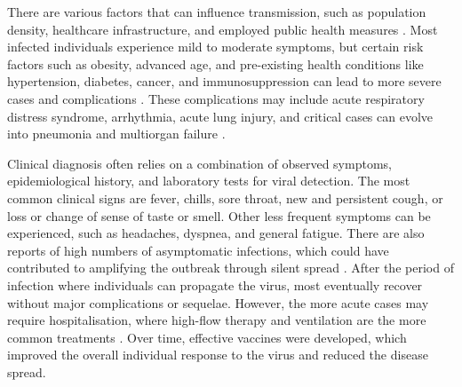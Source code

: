 There are various factors that can influence \covid transmission, such as population density, healthcare infrastructure, and employed public health measures \citep{halaji2021EpidemiologyCOVID19}.
Most infected individuals experience mild to moderate symptoms, but certain risk factors such as obesity, advanced age, and pre-existing health conditions like hypertension, diabetes, cancer, and immunosuppression can lead to more severe cases and complications \citep{meyerowitz2024ClinicalCourse}.
These complications may include acute respiratory distress syndrome, arrhythmia, acute lung injury, and critical cases can evolve into pneumonia and multiorgan failure \citep{wang2020ClinicalCharacteristics, lamers2022SARSCoV2Pathogenesis}.


Clinical diagnosis often relies on a combination of observed symptoms, epidemiological history, and laboratory tests for viral detection.
The most common clinical signs are fever, chills, sore throat, new and persistent cough, or loss or change of sense of taste or smell.
Other less frequent symptoms can be experienced, such as headaches, dyspnea, and general fatigue.
There are also reports of high numbers of asymptomatic infections, which could have contributed to amplifying the outbreak through silent spread \citep{worldhealthorganization2023CoronavirusDisease}.
After the period of infection where individuals can propagate the virus, most eventually recover without major complications or sequelae.
However, the more acute cases may require hospitalisation, where high-flow therapy and ventilation are the more common treatments \citep{wang2020ClinicalCharacteristics}.
Over time, effective vaccines were developed, which improved the overall individual response to the virus and reduced the disease spread.


